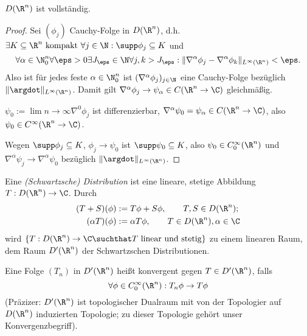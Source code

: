 \begin{st} \label{5.3}
	$D(\R^n)$ ist vollständig.
	\begin{proof}
		Sei $(\phi_j)$ Cauchy-Folge in $D(\R^n)$, d.h. $\exists K \subset \R^n \text{ kompakt } \forall j \in \N: \supp \phi_j \subset K$ und
		\[
			\forall \alpha \in \N_0^n \forall \eps > 0 \exists J_\eps \in \N \forall j,k > J_\eps : \|\nabla^\alpha \phi_j - \nabla^\alpha \phi_k \|_{L^\infty(\R^n)} < \eps.
		\]
		Also ist für jedes feste $\alpha \in \N_0^n$ ist $(\nabla^\alpha \phi_j)_{j\in \N}$ eine Cauchy-Folge bezüglich $\|\argdot\|_{L^\infty(\R^n)}$.
		Damit gilt $\nabla^\alpha \phi_j \to \psi_\alpha \in C(\R^n \to \C)$ gleichmäßig.

		$\psi_0 := \lim{n\to \infty} \nabla^0 \phi_j$ ist differenzierbar, $\nabla^\alpha \psi_0 = \psi_\alpha \in C(\R^n \to \C)$, also $\psi_0 \in C^\infty (\R^n \to \C)$.

		Wegen $\supp \phi_j \subset K$, $\phi_j \to \psi_0$ ist $\supp \psi_0 \subset K$, also $\psi_0 \in C_0^\infty(\R^n)$ und $\nabla^\alpha \psi_j \to \nabla^\alpha \psi_0$ bezüglich $\|\argdot\|_{L^\infty(\R^n)}$.
	\end{proof}
\end{st}

\begin{df} \label{5.4}
	Eine \emph{(Schwartzsche) Distribution} ist eine lineare, stetige Abbildung $T: D(\R^n) \to \C$.
	Durch
	\begin{align*}
		(T+S)(\phi) &:= T\phi + S\phi,  \qquad T,S \in D(\R^n);\\
		(\alpha T)(\phi) &:= \alpha T\phi,  \qquad T\in D(\R^n), \alpha \in \C
	\end{align*}
	wird $\{ T : D(\R^n) \to \C \suchthat T \text{ linear und stetig}\}$ zu einem linearen Raum, dem Raum $D'(\R^n)$ der Schwartzschen Distributionen.

	Eine Folge $(T_n)$ in $D'(\R^n)$ heißt konvergent gegen $T \in D'(\R^n)$, falls
	\[
		\forall \phi \in C_0^\infty(\R^n) : T_n\phi \to T \phi
	\]
	(Präzizer: $D'(\R^n)$ ist topologischer Dualraum mit von der Topologier auf $D(\R^n)$ induzierten Topologie; zu dieser Topologie gehört unser Konvergenzbegriff).
\end{df}


